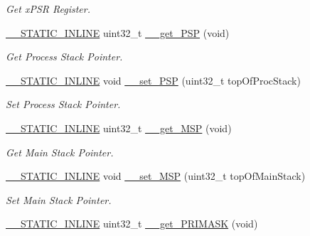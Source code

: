 \begin{DoxyCompactItemize}
\begin{DoxyCompactList}\small\item\em Get x\+P\+SR Register. \end{DoxyCompactList}\item 
\hyperlink{cmsis__iccarm_8h_aba87361bfad2ae52cfe2f40c1a1dbf9c}{\+\_\+\+\_\+\+S\+T\+A\+T\+I\+C\+\_\+\+I\+N\+L\+I\+NE} uint32\+\_\+t \hyperlink{group___c_m_s_i_s___core___reg_acc_functions_ga826c53e30812e350c77f58aac9f42bcb}{\+\_\+\+\_\+get\+\_\+\+P\+SP} (void)
\begin{DoxyCompactList}\small\item\em Get Process Stack Pointer. \end{DoxyCompactList}\item 
\hyperlink{cmsis__iccarm_8h_aba87361bfad2ae52cfe2f40c1a1dbf9c}{\+\_\+\+\_\+\+S\+T\+A\+T\+I\+C\+\_\+\+I\+N\+L\+I\+NE} void \hyperlink{group___c_m_s_i_s___core___reg_acc_functions_ga21f50fc02c3927a8ebf0bc3678c06862}{\+\_\+\+\_\+set\+\_\+\+P\+SP} (uint32\+\_\+t top\+Of\+Proc\+Stack)
\begin{DoxyCompactList}\small\item\em Set Process Stack Pointer. \end{DoxyCompactList}\item 
\hyperlink{cmsis__iccarm_8h_aba87361bfad2ae52cfe2f40c1a1dbf9c}{\+\_\+\+\_\+\+S\+T\+A\+T\+I\+C\+\_\+\+I\+N\+L\+I\+NE} uint32\+\_\+t \hyperlink{group___c_m_s_i_s___core___reg_acc_functions_ga667e7b8b97b4a30f445ae45d37588e45}{\+\_\+\+\_\+get\+\_\+\+M\+SP} (void)
\begin{DoxyCompactList}\small\item\em Get Main Stack Pointer. \end{DoxyCompactList}\item 
\hyperlink{cmsis__iccarm_8h_aba87361bfad2ae52cfe2f40c1a1dbf9c}{\+\_\+\+\_\+\+S\+T\+A\+T\+I\+C\+\_\+\+I\+N\+L\+I\+NE} void \hyperlink{group___c_m_s_i_s___core___reg_acc_functions_ga08b66e2b60a46fada36d90d2bc1e7c9b}{\+\_\+\+\_\+set\+\_\+\+M\+SP} (uint32\+\_\+t top\+Of\+Main\+Stack)
\begin{DoxyCompactList}\small\item\em Set Main Stack Pointer. \end{DoxyCompactList}\item 
\hyperlink{cmsis__iccarm_8h_aba87361bfad2ae52cfe2f40c1a1dbf9c}{\+\_\+\+\_\+\+S\+T\+A\+T\+I\+C\+\_\+\+I\+N\+L\+I\+NE} uint32\+\_\+t \hyperlink{group___c_m_s_i_s___core___reg_acc_functions_ga4ff59fb9e280d19e79e6875863a65f0a}{\+\_\+\+\_\+get\+\_\+\+P\+R\+I\+M\+A\+SK} (void)

\end{DoxyCompactItemize}
